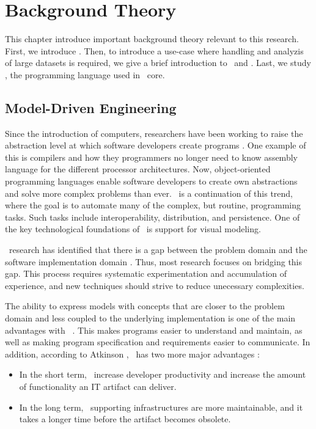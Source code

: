 \chapter{Background Theory}
\label{chap:background}
This chapter introduce important background theory relevant to this research. First, we introduce \mde. Then, to introduce a use-case where handling and analyzis of large datasets is required, we give a brief introduction to \bi~and \bd. Last, we study \delphi, the programming language used in \gap~core.

\clearpage


\section{Model-Driven Engineering}
\label{sec:Model-Driven Engineering}
Since the introduction of computers, researchers have been working to raise the abstraction level at which software developers create programs \cite{Atkinson2003-wr}. One example of this is compilers and how they programmers no longer need to know assembly language for the different processor architectures. Now, object-oriented programming languages enable software developers to create own abstractions and solve more complex problems than ever. \mde~is a continuation of this trend, where the goal is to automate many of the complex, but routine, programming tasks. Such tasks include interoperability, distribution, and persistence. One of the key technological foundations of \mde~is support for visual modeling.

\mde~research has identified that there is a gap between the problem domain and the software implementation domain \cite{France2007-ae}. Thus, most research focuses on bridging this gap. This process requires systematic experimentation and accumulation of experience, and new techniques should strive to reduce unecessary complexities.

The ability to express models with concepts that are closer to the problem domain and less coupled to the underlying implementation is one of the main advantages with \mde~\cite{Selic2003-qa}. This makes programs easier to understand and maintain, as well as making program specification and requirements easier to communicate.  In addition, according to Atkinson \ea, \mde~has two more major advantages \cite{Atkinson2003-wr}:
\begin{itemize}
    \item In the short term, \mde~increase developer productivity and increase the amount of functionality an IT artifact can deliver.
    \item In the long term, \mdd~supporting infrastructures are more maintainable, and it takes a longer time before the artifact becomes obsolete.
\end{itemize}

